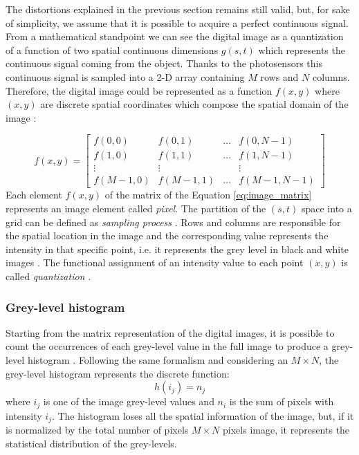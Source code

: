 \documentclass[../main.tex]{subfiles}
\begin{document}
The distortions explained in the previous section remains still valid, but, for sake of simplicity, we assume that it is possible to acquire a perfect continuous signal.
From a mathematical standpoint we can see the digital image as a quantization of a  function of two spatial continuous dimensions $g(s,t)$ which represents the continuous signal coming from the object.
Thanks to the photosensors this continuous signal is sampled into a 2-D array containing $M$ rows and $N$ columns.
Therefore, the digital image could be represented as a function $f(x,y)$ where $(x,y)$ are discrete spatial coordinates which compose the spatial domain of the image \cite{digital_image_processing_gonzales}:

\begin{equation}\label{eq:image_matrix}
    f(x,y) = \begin{bmatrix} f(0,0) & f(0,1) & \dots & f(0,N-1)\\
                            f(1,0) & f(1,1) & \dots & f(1,N-1)\\
                            \vdots & \vdots &     & \vdots \\
                            f(M-1,0) & f(M-1,1) & \dots & f(M-1,N-1)
             \end{bmatrix}
\end{equation}
Each element $f(x,y)$ of the matrix of the Equation \ref{eq:image_matrix} represents an image element called \textit{pixel}.
The partition of the $(s,t)$ space into a grid can be defined as \textit{sampling process} \cite{digital_image_processing_gonzales}. 
Rows and columns are responsible for the spatial location in the image and the corresponding value represents the intensity in that specific point, i.e. it represents the grey level  in black and white images \cite{annadurai2007fundamentals}. 
The functional assignment of an intensity value to each point $(x,y)$ is called \textit{quantization} \cite{digital_image_processing_gonzales}.


\subsubsection{Grey-level histogram}

Starting from the matrix representation of the digital images, it is possible to count the occurrences of each grey-level value in the full image to produce a grey-level histogram \cite{fiete2010modeling}.  
Following the same formalism and considering an $M\times N$, the grey-level histogram represents the discrete function:
\begin{equation}
    h(i_{j})=n_{j} 
\end{equation}
where $i_{j}$ is one of the image grey-level values and $n_{i}$ is the sum of pixels with intensity $i_{j}$.
The histogram loses all the spatial information of the image, but, if it is normalized by the total number of pixels $M\times N$ pixels image, it represents the statistical distribution of the grey-levels. 
\end{document}
